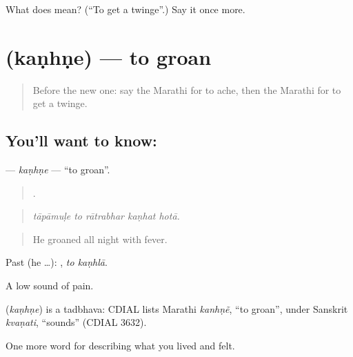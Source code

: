 \begin{tcolorbox}[breakable,colback=teal!4,colframe=teal!35!black,title={Before you move on}]
What does   mean? (\textquotedblleft{}To get a twinge\textquotedblright{}.) Say it once more.
\end{tcolorbox}
\section[\texorpdfstring{\mr{कण्हणे} (kaṇhṇe)}{कण्हणे (kaṇhṇe)}]{ (kaṇhṇe) — to groan}

\label{lesson:MR-C482-kanhne}



\begin{quote}
Before the new one: say the Marathi for to ache, then the Marathi for to get a twinge.
\end{quote}

\subsection*{You'll want to know: }
\textbf{} — \emph{kaṇhṇe} — \textquotedblleft{}to groan\textquotedblright{}.

\begin{quote}
    .
\end{quote}

\begin{quote}
\emph{tāpāmuḷe to rātrabhar kaṇhat hotā.}
\end{quote}

\begin{quote}
He groaned all night with fever.
\end{quote}

Past (he …):  , \emph{to kaṇhlā}.

A low sound of pain.

\begin{cousinweb}
\textbf{} (\emph{kaṇhṇe}) is a tadbhava: CDIAL lists Marathi \emph{kanhṇẽ}, \textquotedblleft{}to groan\textquotedblright{}, under Sanskrit \emph{kvaṇati}, \textquotedblleft{}sounds\textquotedblright{} (CDIAL 3632).
\end{cousinweb}

\begin{grammarlens}[title={What you've built}]
One more word for describing what you lived and felt.
\end{grammarlens}

